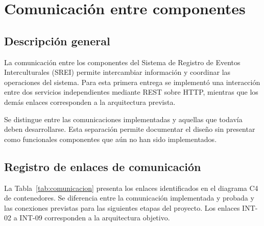 \section{Comunicación entre componentes}

\subsection{Descripción general}

La comunicación entre los componentes del Sistema de Registro de Eventos Interculturales (SREI) permite intercambiar información y coordinar las operaciones del sistema. Para esta primera entrega se implementó una interacción entre dos servicios independientes mediante REST sobre HTTP, mientras que los demás enlaces corresponden a la arquitectura prevista.

Se distingue entre las comunicaciones implementadas y aquellas que todavía deben desarrollarse. Esta separación permite documentar el diseño sin presentar como funcionales componentes que aún no han sido implementados.


\subsection{Registro de enlaces de comunicación}

La Tabla~\ref{tab:comunicacion} presenta los enlaces identificados en el diagrama C4 de contenedores. Se diferencia entre la comunicación implementada y probada y las conexiones previstas para las siguientes etapas del proyecto. Los enlaces INT-02 a INT-09 corresponden a la arquitectura objetivo.

\small
\setlength{\tabcolsep}{1pt}
\renewcommand{\arraystretch}{1.3}

